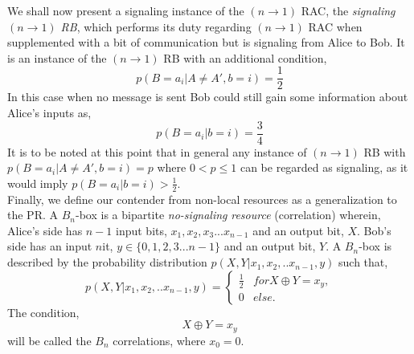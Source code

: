 \documentclass[%
 reprint,
 amsmath,amssymb,
 aps,
]{revtex4-1}
\begin{document}
We shall now present a signaling instance of the $(n\rightarrow1)$ RAC, the \textit{signaling $(n\rightarrow1)$ RB}, which performs its duty regarding $(n\rightarrow 1)$ RAC when supplemented with a bit of communication but is signaling from Alice to Bob. It is an instance of the $(n\rightarrow1)$ RB with an additional condition,
\begin{equation}\label{sigme}
p(B=a_i|A\neq A',b=i)=\frac{1}{2}
\end{equation}
In this case when no message is sent Bob could still gain some information about Alice's inputs as,
\begin{equation}
p(B=a_i|b=i)=\frac{3}{4}
\end{equation}
It is to be noted at this point that in general any instance of $(n\rightarrow1)$ RB with $p(B=a_i|A\neq A',b=i)=p$ where $0<p\leq 1$ can be regarded as signaling, as it would imply  $p(B=a_i|b=i)> \frac{1}{2}$.  \\
Finally, we define our contender from non-local resources as a generalization to the PR. A  $B_n$-box is a bipartite \textit{no-signaling} \textit{resource} (correlation) wherein, Alice's side has $n-1$ input bits, $x_{1},x_{2},x_{3}...x_{n-1}$ and an output bit, $X$. Bob's side has an input $n$it, $y\in\{0,1,2,3...n-1\}$ and an output bit, $Y$. A $B_n$-box is described by the probability distribution $p(X,Y|x_1,x_2,..x_{n-1},y)$ such that,
\begin{equation}
p(X,Y|x_1,x_2,..x_{n-1},y)=
\begin{cases}
\frac{1}{2} & for X\oplus Y=x_y,\\
0 & else.
\end{cases}
\end{equation}
The condition,
\begin{equation} \label{Bncorr}
X\oplus Y=x_y
\end{equation}
will be called the $B_n$ correlations, where $x_0=0$. 
\end{document}
